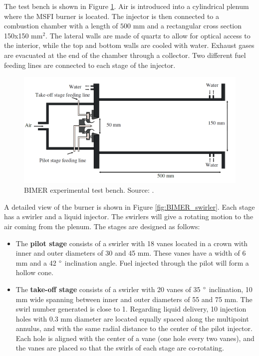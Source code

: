 The test bench is shown in Figure \ref{fig:BIMER_test_bench_expe_maquette}. Air is introduced into a cylindrical plenum where the MSFI burner is located. The injector is then connected to a combustion chamber with a length of $500$ mm and a rectangular cross section 150x150 mm$^2$. The lateral walls are made of quartz to allow for optical access to the interior, while the top and bottom walls are cooled with water. Exhaust gases are evacuated at the end of the chamber through a collector. Two different fuel feeding lines are connected to each stage of the injector. 

\begin{figure}[h!]
	\centering
	\includegraphics[scale=0.5]{./part3_applications/figures_ch7_aero/BIMER_test_bench_expe_maquette}
	\caption[BIMER experimental test bench]{BIMER experimental test bench. Source: .}
	\label{fig:BIMER_test_bench_expe_maquette}
\end{figure}

A detailed view of the burner is shown in Figure \ref{fig:BIMER_swirler}. Each stage has a swirler and a liquid injector. The swirlers will give a rotating motion to the air coming from the plenum. The stages are designed as follows:

\begin{itemize}

	\item The \textbf{pilot stage} consists of a swirler with 18 vanes located in a crown with inner and outer diameters of 30 and 45 mm. These vanes have a width of 6 mm and a 42 $\degree$ inclination angle. Fuel injected through the pilot will form a hollow cone.
	
	\item The \textbf{take-off stage} consists of a swirler with 20 vanes of 35 $\degree$ inclination, 10 mm wide spanning between inner and outer diameters of 55 and 75 mm. The swirl number generated is close to 1. Regarding liquid delivery, 10 injection holes with $0.3$ mm diameter are located equally spaced along the multipoint annulus, and with the same radial distance to the center of the pilot injector. Each hole is aligned with the center of a vane (one hole every two vanes), and the vanes are placed so that the swirls of each stage are co-rotating.

\end{itemize}

